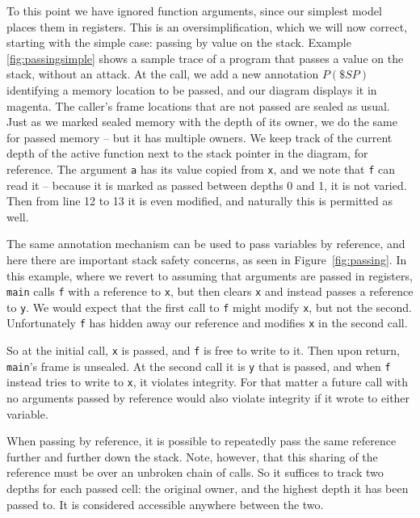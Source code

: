 \documentclass[acmsmall,review,anonymous]{acmart}\settopmatter{printfolios=true,printccs=false,printacmref=false}
\begin{document}
To this point we have ignored function arguments, since our simplest model places them in
registers. This is an oversimplification, which we will now correct, starting with the simple
case: passing by value on the stack. Example \ref{fig:passingsimple} shows a sample trace of
a program that passes a value on the stack, without an attack.
At the call, we add a new annotation \(P(\$SP)\) identifying a memory location to be
passed, and our diagram displays it in magenta. The caller's frame locations that are not
passed are sealed as usual. Just as we marked sealed memory with the depth of its owner,
we do the same for passed memory -- but it has multiple owners. We keep track of the
current depth of the active function next to the stack pointer in the diagram, for reference.
The argument {\tt a} has
its value copied from {\tt x}, and we note that {\tt f} can read it -- because it is marked
as passed between depths 0 and 1, it is not varied. Then from line 12 to 13 it is even
modified, and naturally this is permitted as well.

The same annotation mechanism can be used to pass
variables by reference, and here there are important stack safety concerns,
as seen in Figure~\ref{fig:passing}. In this example, where we revert to assuming
that arguments are passed in registers,
{\tt main} calls {\tt f} with a reference to {\tt x}, but then clears {\tt x} and instead
passes a reference to {\tt y}. We would expect that the first call to {\tt f} might modify
{\tt x}, but not the second. Unfortunately {\tt f} has hidden away our reference and modifies
{\tt x} in the second call.

So at the initial call, {\tt x} is passed, and {\tt f} is free to write to it. Then upon
return, {\tt main}'s frame is unsealed. At the second call it is {\tt y} that is passed,
and when {\tt f} instead tries to write to {\tt x}, it violates integrity. For that matter
a future call with no arguments passed by reference would also violate integrity if it wrote
to either variable.

When passing by reference, it is possible to repeatedly pass the same reference further
and further down the stack. Note, however, that this sharing of the reference must be over
an unbroken chain of calls. So it suffices to track two depths for each passed
cell: the original owner, and the highest depth it has been passed to. It is considered
accessible anywhere between the two.
\end{document}
